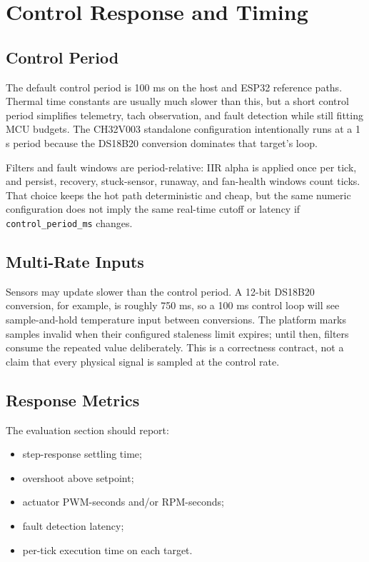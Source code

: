 \section{Control Response and Timing}

\subsection{Control Period}

The default control period is 100 ms on the host and ESP32 reference paths. Thermal time constants are usually much slower than this, but a short control period simplifies telemetry, tach observation, and fault detection while still fitting MCU budgets. The CH32V003 standalone configuration intentionally runs at a 1 s period because the DS18B20 conversion dominates that target's loop.

Filters and fault windows are period-relative: IIR alpha is applied once per tick, and persist, recovery, stuck-sensor, runaway, and fan-health windows count ticks. That choice keeps the hot path deterministic and cheap, but the same numeric configuration does not imply the same real-time cutoff or latency if \texttt{control\_period\_ms} changes.

\subsection{Multi-Rate Inputs}

Sensors may update slower than the control period. A 12-bit DS18B20 conversion, for example, is roughly 750 ms, so a 100 ms control loop will see sample-and-hold temperature input between conversions. The platform marks samples invalid when their configured staleness limit expires; until then, filters consume the repeated value deliberately. This is a correctness contract, not a claim that every physical signal is sampled at the control rate.

\subsection{Response Metrics}

The evaluation section should report:

\begin{itemize}[leftmargin=*]
    \item step-response settling time;
    \item overshoot above setpoint;
    \item actuator PWM-seconds and/or RPM-seconds;
    \item fault detection latency;
    \item per-tick execution time on each target.
\end{itemize}

